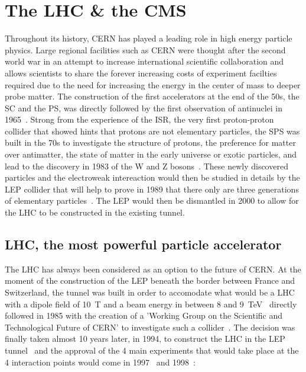 \section{The \acl{LHC} \& the \acl{CMS}}
\label{chapt2:sec:LHC-CMS}

	Throughout its history, CERN has played a leading role in high energy particle physics. Large regional facilities such as CERN were thought after the second world war in an attempt to increase international scientific collaboration and allows scientists to share the forever increasing costs of experiment facilties required due to the need for increasing the energy in the center of mass to deeper probe matter. The construction of the first accelerators at the end of the 50s, the \acf{SC} and the \acf{PS}, was directly followed by the first observation of antinuclei in 1965~\cite{MASSAM1965}. Strong from the experience of the \acf{ISR}, the very first proton-proton collider that showed hints that protons are not elementary particles, the \acf{SPS} was built in the 70s to investigate the structure of protons, the preference for matter over antimatter, the state of matter in the early universe or exotic particles, and lead to the discovery in 1983 of the W and Z bosons~\cite{UA1W1983,UA2W1983,UA1Z1983,UA2Z1983}. These newly discovered particles and the electroweak intereaction would then be studied in details by the \acf{LEP} collider that will help to prove in 1989 that there only are three generations of elementary particles~\cite{ALEPH1989}. The LEP would then be dismantled in 2000 to allow for the LHC to be constructed in the existing tunnel.

	\subsection{LHC, the most powerful particle accelerator}
	\label{chapt2:ssec:LHC}
	
	The LHC has always been considered as an option to the future of CERN. At the moment of the construction of the LEP beneath the border between France and Switzerland, the tunnel was built in order to accomodate what would be a \acl{LHC} with a dipole field of \SI{10}{T} and a beam energy in between 8 and \SI{9}{TeV}~\cite{ANNUALREPORT1984} directly followed in 1985 with the creation of a 'Working Group on the Scientific and Technological Future of CERN' to investigate such a collider~\cite{ANNUALREPORT1985}. The decision was finally taken almost 10 years later, in 1994, to construct the LHC in the LEP tunnel~\cite{ANNUALREPORT1994} and the approval of the 4 main experiments that would take place at the 4 interaction points would come in 1997~\cite{ANNUALREPORT1997} and 1998~\cite{ANNUALREPORT1998}:
	
